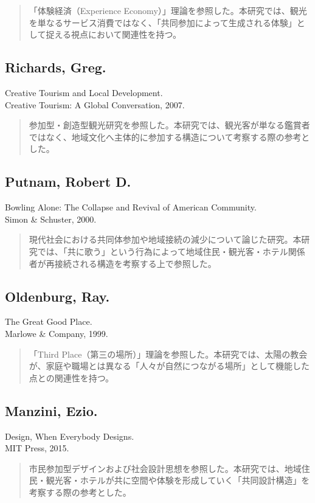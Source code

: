 \begin{quote}
「体験経済（Experience Economy）」理論を参照した。本研究では、観光を単なるサービス消費ではなく、「共同参加によって生成される体験」として捉える視点において関連性を持つ。
\end{quote}

\subsection*{Richards, Greg.}
\noindent Creative Tourism and Local Development.\\Creative Tourism: A Global Conversation, 2007.

\begin{quote}
参加型・創造型観光研究を参照した。本研究では、観光客が単なる鑑賞者ではなく、地域文化へ主体的に参加する構造について考察する際の参考とした。
\end{quote}

\subsection*{Putnam, Robert D.}
\noindent Bowling Alone: The Collapse and Revival of American Community.\\Simon \& Schuster, 2000.

\begin{quote}
現代社会における共同体参加や地域接続の減少について論じた研究。本研究では、「共に歌う」という行為によって地域住民・観光客・ホテル関係者が再接続される構造を考察する上で参照した。
\end{quote}

\subsection*{Oldenburg, Ray.}
\noindent The Great Good Place.\\Marlowe \& Company, 1999.

\begin{quote}
「Third Place（第三の場所）」理論を参照した。本研究では、太陽の教会が、家庭や職場とは異なる「人々が自然につながる場所」として機能した点との関連性を持つ。
\end{quote}

\subsection*{Manzini, Ezio.}
\noindent Design, When Everybody Designs.\\MIT Press, 2015.

\begin{quote}
市民参加型デザインおよび社会設計思想を参照した。本研究では、地域住民・観光客・ホテルが共に空間や体験を形成していく「共同設計構造」を考察する際の参考とした。
\end{quote}
